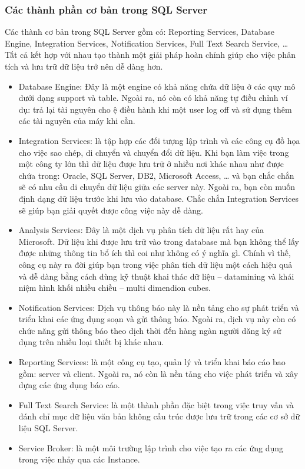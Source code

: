\subsubsection{Các thành phần cơ bản trong SQL Server}
Các thành cơ bản trong SQL Server gồm có: Reporting Services, Database Engine, Integration Services, Notification Services, Full Text Search Service, … Tất cả kết hợp với nhau tạo thành một giải pháp hoàn chỉnh giúp cho việc phân tích và lưu trữ dữ liệu trở nên dễ dàng hơn.
\begin{itemize}
\item	Database Engine: Đây là một engine có khả năng chứa dữ liệu ở các quy mô dưới dạng support và table. Ngoài ra, nó còn có khả năng tự điều chỉnh ví dụ: trả lại tài nguyên cho ệ điều hành khi một user log off và sử dụng thêm các tài nguyên của máy khi cần.
\item	Integration Services: là tập hợp các đối tượng lập trình và các công cụ đồ họa cho việc sao chép, di chuyển và chuyển đổi dữ liệu.  Khi bạn làm việc trong một công ty lớn thì dữ liệu được lưu trữ ở nhiều nơi khác nhau như được chứa trong: Oracle, SQL Server, DB2, Microsoft Access, … và bạn chắc chắn sẽ có nhu cầu di chuyển dữ liệu giữa các server này. Ngoài ra, bạn còn muốn định dạng dữ liệu trước khi lưu vào database. Chắc chắn Integration Services sẽ giúp bạn giải quyết được công việc này dễ dàng.
\item	Analysis Services: Đây là một dịch vụ phân tích dữ liệu rất hay của Microsoft. Dữ liệu khi được lưu trữ vào trong database mà bạn không thể lấy được những thông tin bổ ích thì coi như không có ý nghĩa gì. Chính vì thế, công cụ này ra đời giúp bạn trong việc phân tích dữ liệu một cách hiệu quả và dễ dàng bằng cách dùng kỹ thuật khai thác dữ liệu – datamining và khái niệm hình khối nhiều chiều – multi dimendion cubes.
\item	Notification Services: Dịch vụ thông báo này là nền tảng cho sự phát triển và triển khai các ứng dụng soạn và gửi thông báo. Ngoài ra, dịch vụ này còn có chức năng gửi thông báo theo dịch thời đến hàng ngàn người dăng ký sử dụng trên nhiều loại thiết bị khác nhau.
\item	Reporting  Services: là một công cụ tạo, quản lý và triển khai báo cáo bao gồm: server và client. Ngoài ra, nó còn là nền tảng cho việc phát triển và xây dựng các ứng dụng báo cáo.
\item	Full Text Search Service: là một thành phần đặc biệt trong việc truy vấn và đánh chỉ mục dữ liệu văn bản không cấu trúc được lưu trữ trong các cơ sở dữ liệu SQL Server.
\item	Service Broker: là một môi trường lập trình cho việc tạo ra các ứng dụng trong việc nhảy qua các Instance.
\end{itemize}
